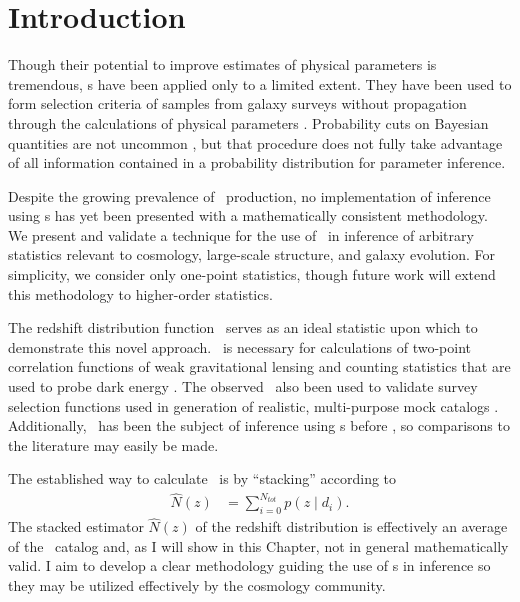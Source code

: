 \section{Introduction}

Though their potential to improve estimates of physical parameters is tremendous, \pzpdf s have been applied only to a limited extent.  
They have been used to form selection criteria of samples from galaxy surveys without propagation 
through the calculations of physical parameters \citep{VanBreukelen2009,Viironen2015}.  
Probability cuts on Bayesian quantities are not uncommon \citep{Leung2015, DiPompeo2015a}, but that procedure does not fully take advantage of all information contained in a probability distribution for parameter inference.  

Despite the growing prevalence of \pzpdf\ production, no implementation of inference using \pzpdf s has yet been presented with a mathematically consistent methodology.  
We present and validate a technique for the use of \pzpdf\ in inference of arbitrary statistics relevant to cosmology, large-scale structure, and galaxy evolution.  
For simplicity, we consider only one-point statistics, though future work will extend this methodology to higher-order statistics.

The redshift distribution function \Nz\ serves as an ideal statistic upon which to demonstrate this novel approach.  
\Nz\ is necessary for calculations of two-point correlation functions of weak gravitational lensing and counting statistics that are used to probe dark energy \citep{Masters2015}.  
The observed \Nz\ also been used to validate survey selection functions used in generation of realistic, multi-purpose mock catalogs \citep{Norberg2002}.  
Additionally, \Nz\ has been the subject of inference using \pzpdf s before \citep{Sheldon2012, Hildebrandt2012, Kelly2014, Benjamin2013, Bonnett2015a, Viironen2015, Asorey2016, Leistedt2016}, so comparisons to the literature may easily be made. 

The established way to calculate \Nz\ is by ``stacking'' according to
\begin{align}
\label{eq:stackwithdata}
\hat{N}(z) &= \sum_{i = 0}^{N_{tot}} p(z \mid d_{i}) .
\end{align}
The stacked estimator $\hat{N}(z)$ of the redshift distribution is effectively an average of the \pzpdf\ catalog and, as I will show in this Chapter, not in general mathematically valid.
I aim to develop a clear methodology guiding the use of \pzpdf s in inference so they may be utilized effectively by the cosmology community.

